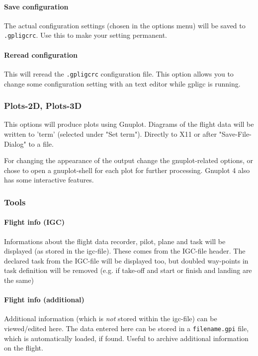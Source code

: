 \paragraph{Save configuration}
The actual configuration settings (chosen in the options menu) will be saved to \texttt{.gpligcrc}.
Use this to make your setting permanent.

\paragraph{Reread configuration}
This will reread the \texttt{.gpligcrc} configuration file.
This option allows you to change some configuration setting with an text editor while gpligc is running.


\subsubsection{Plots-2D, Plots-3D}
This options will produce plots using Gnuplot.
Diagrams of the flight data will be written to 'term' (selected under "Set term").
Directly to X11 or after "Save-File-Dialog" to a file.

For changing the appearance of the output change the gnuplot-related options, or chose to open 
a gnuplot-shell for each plot for further processing.
Gnuplot 4 also has some interactive features.

\subsubsection{Tools}

\paragraph{Flight info (IGC)}
Informations about the flight data recorder, pilot, plane and task will be displayed (as stored in the igc-file).
These comes from the IGC-file header.
The declared task from the IGC-file will be displayed too, but doubled way-points in task definition will be removed
(e.g. if take-off and start or finish and landing are the same)

\paragraph{Flight info (additional)}
\label{add_info}
Additional information (which is \emph{not} stored within the igc-file) can be viewed/edited here.
The data entered here can be stored in a \texttt{filename.gpi} file, which is automatically loaded, if found.
Useful to archive additional information on the flight.


